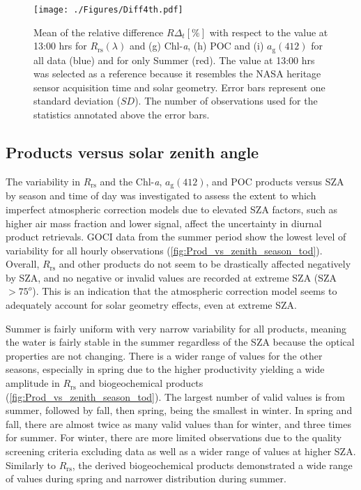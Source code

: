 \documentclass[remotesensing,article,submit,moreauthors,pdftex,10pt,a4paper]{Definitions/mdpi}
\begin{document}
               
\begin{figure}[htbp!]
  \centering
  \texttt{[image: ./Figures/Diff4th.pdf]}
    \caption{Mean of the relative difference $R\Delta_t[\%]$ with respect to the value at 13:00 hrs for $R_\text{rs}(\lambda)$ and (g) Chl-{\it a}, (h) POC and (i) $a_\text{g}(412)$ for all data (blue) and for only Summer (red). The value at 13:00 hrs was selected as a reference because it resembles the NASA heritage sensor acquisition time and solar geometry. Error bars represent one standard deviation ($SD$). The number of observations used for the statistics annotated above the error bars. \label{fig:Diff4th} } 
\end{figure}

\subsection{Products versus solar zenith angle}
The variability in $R_\text{rs}$ and the Chl-{\it a}, $a_\text{g}(412)$, and POC products versus SZA by season and time of day was investigated to assess the extent to which imperfect atmospheric correction models due to elevated SZA factors, such as higher air mass fraction and lower signal, affect the uncertainty in diurnal product retrievals. GOCI data from the summer period show the lowest level of variability for all hourly observations (\autoref{fig:Prod_vs_zenith_season_tod}). Overall, $R_\text{rs}$ and other products do not seem to be drastically affected negatively by SZA, and no negative or invalid values are recorded at extreme SZA (SZA$>75^o$). This is an indication that the atmospheric correction model seems to adequately account for solar geometry effects, even at extreme SZA.

Summer is fairly uniform with very narrow variability for all products, meaning the water is fairly stable in the summer regardless of the SZA because the optical properties are not changing. There is a wider range of values for the other seasons, especially in spring due to the higher productivity yielding a wide amplitude in $R_\text{rs}$ and biogeochemical products (\autoref{fig:Prod_vs_zenith_season_tod}). The largest number of valid values is from summer, followed by fall, then spring, being the smallest in winter. In spring and fall, there are almost twice as many valid values than for winter, and three times for summer. For winter, there are more limited observations due to the quality screening criteria excluding data as well as a wider range of values at higher SZA. Similarly to $R_\text{rs}$, the derived biogeochemical products demonstrated a wide range of values during spring and narrower distribution during summer.
\end{document}
